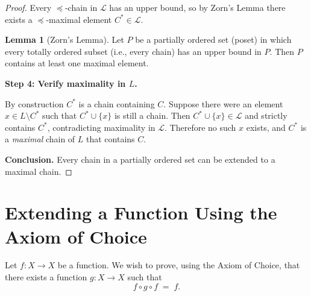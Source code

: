 \documentclass[12pt]{article}
\theoremstyle{definition} %
\newtheorem{lemma}{Lemma}
\theoremstyle{plain} %
\begin{document}
\begin{proof}
    Every \(\preceq\)-chain in \(\mathcal L\) has an upper bound, so by
    Zorn’s Lemma there exists a \(\preceq\)-maximal element
    \(C^{\ast}\in\mathcal L\).
    \begin{lemma}[Zorn's Lemma]
        Let $P$ be a partially ordered set (poset) in which every totally ordered subset 
        (i.e., every chain) has an upper bound in $P$. Then $P$ contains at least 
        one maximal element.
        \end{lemma}

    \bigskip
    \textbf{Step 4:  Verify maximality in \(L\).}

    By construction \(C^{\ast}\) is a chain containing \(C\).
    Suppose there were an element \(x\in L\setminus C^{\ast}\) such that
    \(C^{\ast}\cup\{x\}\) is still a chain.
    Then \(C^{\ast}\cup\{x\}\in\mathcal L\) and strictly contains
    \(C^{\ast}\), contradicting maximality in \(\mathcal L\).
    Therefore no such \(x\) exists, and \(C^{\ast}\) is a
    \emph{maximal} chain of \(L\) that contains \(C\).

    \bigskip
    \textbf{Conclusion.}\;
    Every chain in a partially ordered set can be extended to a maximal
    chain.
\end{proof}
\section*{Extending a Function Using the Axiom of Choice}

Let \(f:X\to X\) be a function. We wish to prove, using the Axiom of Choice, that there exists a function \(g:X\to X\) such that
\[
  f \circ g \circ f \;=\; f.
\]
\end{document}
